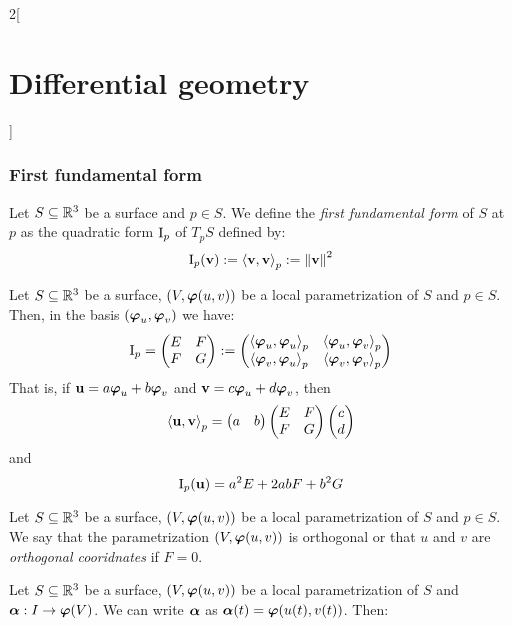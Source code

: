 \documentclass[../../../main.tex]{subfiles}
\begin{document}
\begin{multicols}{2}[\section{Differential geometry}]
  \subsubsection{First fundamental form}
  \begin{definition}
    Let $S\subseteq\mathbb{R}^3$ be a surface and $p\in S$. We define the \emph{first fundamental form} of $S$ at $p$ as the quadratic form $\mathrm{I}_p$ of $T_pS$ defined by:
    $$\mathrm{I}_p(\boldsymbol{\mathrm{v}}):={\langle\boldsymbol{\mathrm{v}},\boldsymbol{\mathrm{v}}\rangle}_p:={\|\boldsymbol{\mathrm{v}}\|}^2$$
  \end{definition}
  \begin{proposition}
    Let $S\subseteq\mathbb{R}^3$ be a surface, $(V,\boldsymbol{\mathrm{\varphi}}(u,v))$ be a local parametrization of $S$ and $p\in S$. Then, in the basis $(\boldsymbol{\mathrm{\varphi}}_u,\boldsymbol{\mathrm{\varphi}}_v)$ we have:
    $$
      \mathrm{I}_p=\begin{pmatrix}
        E & F \\
        F & G
      \end{pmatrix}:=\begin{pmatrix}
        {\langle\boldsymbol{\mathrm{\varphi}}_u,\boldsymbol{\mathrm{\varphi}}_u\rangle}_p & {\langle\boldsymbol{\mathrm{\varphi}}_u,\boldsymbol{\mathrm{\varphi}}_v\rangle}_p \\
        {\langle\boldsymbol{\mathrm{\varphi}}_v,\boldsymbol{\mathrm{\varphi}}_u\rangle}_p & {\langle\boldsymbol{\mathrm{\varphi}}_v,\boldsymbol{\mathrm{\varphi}}_v\rangle}_p
      \end{pmatrix}
    $$
    That is, if $\boldsymbol{\mathrm{u}}=a\boldsymbol{\mathrm{\varphi}}_u+b\boldsymbol{\mathrm{\varphi}}_v$ and $\boldsymbol{\mathrm{v}}=c\boldsymbol{\mathrm{\varphi}}_u+d\boldsymbol{\mathrm{\varphi}}_v$, then
    $${\langle\boldsymbol{\mathrm{u}},\boldsymbol{\mathrm{v}}\rangle}_p=\begin{pmatrix}
        a & b
      \end{pmatrix}\begin{pmatrix}
        E & F \\
        F & G
      \end{pmatrix}\begin{pmatrix}
        c \\
        d
      \end{pmatrix}$$
    and $$\mathrm{I}_p(\boldsymbol{\mathrm{u}})=a^2 E+2ab F+b^2G$$
  \end{proposition}
  \begin{definition}
    Let $S\subseteq\mathbb{R}^3$ be a surface, $(V,\boldsymbol{\mathrm{\varphi}}(u,v))$ be a local parametrization of $S$ and $p\in S$. We say that the parametrization $(V,\boldsymbol{\mathrm{\varphi}}(u,v))$ is orthogonal or that $u$ and $v$ are \emph{orthogonal cooridnates} if $F=0$.
  \end{definition}
  \begin{proposition}
    Let $S\subseteq\mathbb{R}^3$ be a surface, $(V,\boldsymbol{\mathrm{\varphi}}(u,v))$ be a local parametrization of $S$ and $\boldsymbol{\mathrm{\alpha}}:I\rightarrow\boldsymbol{\mathrm{\varphi}}(V)$. We can write $\boldsymbol{\mathrm{\alpha}}$ as $\boldsymbol{\mathrm{\alpha}}(t)=\boldsymbol{\mathrm{\varphi}}(u(t),v(t))$. Then:

\end{proposition}
\end{multicols}
\end{document}
